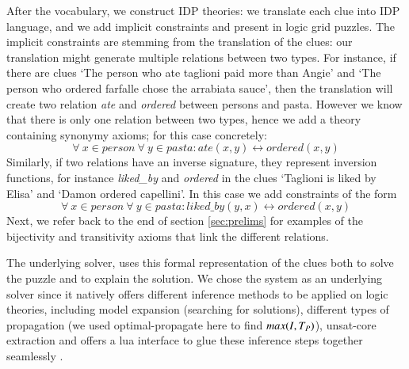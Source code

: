 After the vocabulary, we construct IDP theories: we translate each clue into IDP language, and  we add implicit constraints and present in logic grid puzzles.
The implicit constraints are stemming from the translation of the clues: our translation might generate multiple relations between two types. 
For instance, if there are clues `The person who ate taglioni paid more than Angie' and `The person who ordered farfalle chose the arrabiata sauce', then the translation will create two relation \textit{ate} and \textit{ordered} between persons and pasta.
However we know that there is only one relation between two types, hence we add a theory containing synonymy axioms; for this case concretely:
\[ \forall \ x \in person \ \forall \ y \in pasta : ate(x, y) \leftrightarrow ordered(x, y) \]
Similarly, if two relations have an inverse signature, they represent inversion functions, for instance \textit{liked\_by} and \textit{ordered} in the clues `Taglioni is liked by Elisa' and `Damon ordered capellini'. 
In this case we add constraints of the form 
\[ \forall \ x \in person \ \forall \ y \in pasta : liked\_by(y, x) \leftrightarrow ordered(x, y)\]
Next, we refer back to the end of section \ref{sec:prelims} for examples of the bijectivity and transitivity axioms that link the different relations.

The underlying solver, \idp\cite{IDP} uses this formal representation of the clues both to solve the puzzle and to explain the solution. 
We chose the \idp system as an underlying solver since it natively offers different inference methods to be applied on logic theories, including model expansion (searching for solutions), different types of propagation (we used optimal-propagate here to find $max(I,T_P)$), unsat-core extraction and offers a lua interface to glue these inference steps together seamlessly \cite{IDP}.


